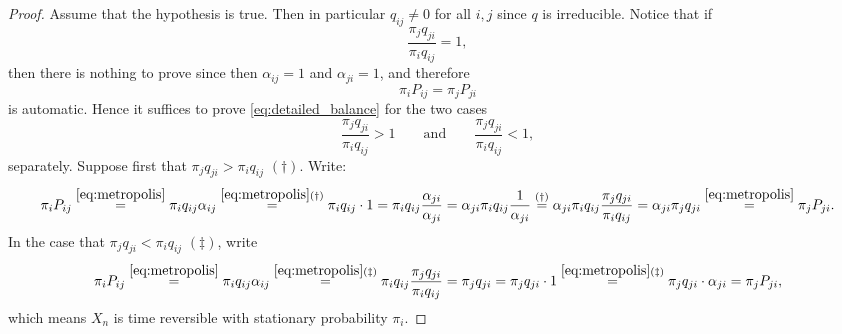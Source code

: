 \documentclass[11pt,english,a4paper]{article}
\begin{document}
\begin{proof}
Assume that the hypothesis is true. Then in particular $q_{  ij} \neq 0$ for all $i,j$ since $q$ is irreducible. Notice that if 
\[
\frac{\pi_j q_{  ji}}{\pi_i q_{  ij}} = 1,
\]
then there is nothing to prove since then $\alpha_{ij} = 1$ and $\alpha_{ji} = 1$, and therefore
\begin{equation}
\pi_iP_{  ij} = \pi_jP_{  ji} \label{eq:detailed_balance}
\end{equation} 
is automatic. Hence it suffices to prove \eqref{eq:detailed_balance} for the two cases
\[
\frac{\pi_j q_{  ji}}{\pi_i q_{  ij}} > 1 \qquad \text{and} \qquad \frac{\pi_j q_{  ji}}{\pi_i q_{  ij}} < 1,
\]
separately. Suppose first that $\pi_j q_{  ji} > \pi_i q_{  ij}$ $(\dagger)$. Write:
\[
\pi_iP_{  ij} \stackrel{\eqref{eq:metropolis}}{=} \pi_i  q_{  ij} \alpha_{  ij} \stackrel{\eqref{eq:metropolis}(\dagger)}{=} \pi_i q_{  ij} \cdot 1 =
\pi_i q_{  ij}  \frac{\alpha_{  ji}}{\alpha_{  ji}} = \alpha_{  ji}\pi_i q_{  ij}  \frac{1}{\alpha_{  ji}} \stackrel{(\dagger)}{=} \alpha_{  ji}\pi_i q_{  ij}  \frac{\pi_j q_{  ji}}{\pi_i q_{  ij}} = \alpha_{  ji}  \pi_j q_{  ji} \stackrel{\eqref{eq:metropolis}}{=} \pi_jP_{  ji}. 
\]
In the case that $\pi_j q_{  ji} < \pi_i q_{  ij}$ $(\ddagger)$, write
\[
\pi_iP_{  ij} \stackrel{\eqref{eq:metropolis}}{=} \pi_i  q_{  ij} \alpha_{  ij} \stackrel{\eqref{eq:metropolis}(\ddagger)}{=} \pi_i q_{  ij} \frac{\pi_j q_{  ji}}{\pi_i q_{  ij}} = \pi_j q_{  ji} = \pi_j q_{  ji} \cdot 1 \stackrel{\eqref{eq:metropolis}(\ddagger)}{=} \pi_j q_{  ji} \cdot \alpha_{  ji} = \pi_jP_{  ji},
\]
which means $X_n$ is time reversible with stationary probability $\pi_i$.
\end{proof}

\printbibliography
\end{document}
